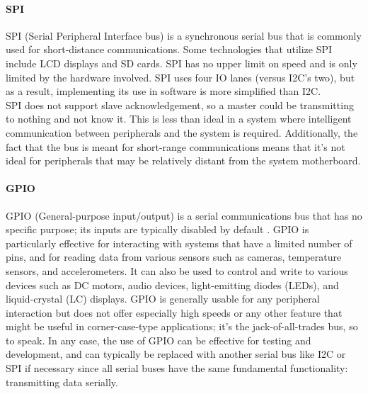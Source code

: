 \paragraph{SPI}
SPI (Serial Peripheral Interface bus) is a synchronous serial bus that is commonly used for short-distance communications. Some technologies that utilize SPI include LCD displays and SD cards. SPI has no upper limit on speed and is only limited by the hardware involved. SPI uses four IO lanes (versus I2C's two), but as a result, implementing its use in software is more simplified than I2C. \\

SPI does not support slave acknowledgement, so a master could be transmitting to nothing and not know it. This is less than ideal in a system where intelligent communication between peripherals and the system is required. Additionally, the fact that the bus is meant for short-range communications means that it's not ideal for peripherals that may be relatively distant from the system motherboard.

\paragraph{GPIO}
GPIO (General-purpose input/output) is a serial communications bus that has no specific purpose; its inputs are typically disabled by default \cite{JavaME}. GPIO is particularly effective for interacting with systems that have a limited number of pins, and for reading data from various sensors such as cameras, temperature sensors, and accelerometers. It can also be used to control and write to various devices such as DC motors, audio devices, light-emitting diodes (LEDs), and liquid-crystal (LC) displays. GPIO is generally usable for any peripheral interaction but does not offer especially high speeds or any other feature that might be useful in corner-case-type applications; it's the jack-of-all-trades bus, so to speak. In any case, the use of GPIO can be effective for testing and development, and can typically be replaced with another serial bus like I2C or SPI if necessary since all serial buses have the same fundamental functionality: transmitting data serially.

